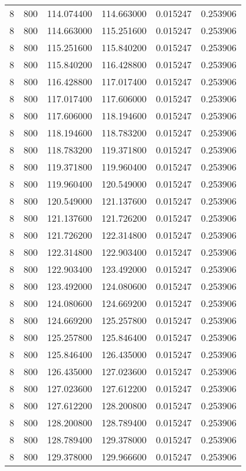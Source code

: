 \begin{longtable}{rrrrrr}
8 & 800 & 114.074400 & 114.663000 & 0.015247 & 0.253906 \\
8 & 800 & 114.663000 & 115.251600 & 0.015247 & 0.253906 \\
8 & 800 & 115.251600 & 115.840200 & 0.015247 & 0.253906 \\
8 & 800 & 115.840200 & 116.428800 & 0.015247 & 0.253906 \\
8 & 800 & 116.428800 & 117.017400 & 0.015247 & 0.253906 \\
8 & 800 & 117.017400 & 117.606000 & 0.015247 & 0.253906 \\
8 & 800 & 117.606000 & 118.194600 & 0.015247 & 0.253906 \\
8 & 800 & 118.194600 & 118.783200 & 0.015247 & 0.253906 \\
8 & 800 & 118.783200 & 119.371800 & 0.015247 & 0.253906 \\
8 & 800 & 119.371800 & 119.960400 & 0.015247 & 0.253906 \\
8 & 800 & 119.960400 & 120.549000 & 0.015247 & 0.253906 \\
8 & 800 & 120.549000 & 121.137600 & 0.015247 & 0.253906 \\
8 & 800 & 121.137600 & 121.726200 & 0.015247 & 0.253906 \\
8 & 800 & 121.726200 & 122.314800 & 0.015247 & 0.253906 \\
8 & 800 & 122.314800 & 122.903400 & 0.015247 & 0.253906 \\
8 & 800 & 122.903400 & 123.492000 & 0.015247 & 0.253906 \\
8 & 800 & 123.492000 & 124.080600 & 0.015247 & 0.253906 \\
8 & 800 & 124.080600 & 124.669200 & 0.015247 & 0.253906 \\
8 & 800 & 124.669200 & 125.257800 & 0.015247 & 0.253906 \\
8 & 800 & 125.257800 & 125.846400 & 0.015247 & 0.253906 \\
8 & 800 & 125.846400 & 126.435000 & 0.015247 & 0.253906 \\
8 & 800 & 126.435000 & 127.023600 & 0.015247 & 0.253906 \\
8 & 800 & 127.023600 & 127.612200 & 0.015247 & 0.253906 \\
8 & 800 & 127.612200 & 128.200800 & 0.015247 & 0.253906 \\
8 & 800 & 128.200800 & 128.789400 & 0.015247 & 0.253906 \\
8 & 800 & 128.789400 & 129.378000 & 0.015247 & 0.253906 \\
8 & 800 & 129.378000 & 129.966600 & 0.015247 & 0.253906 \\

\end{longtable}
